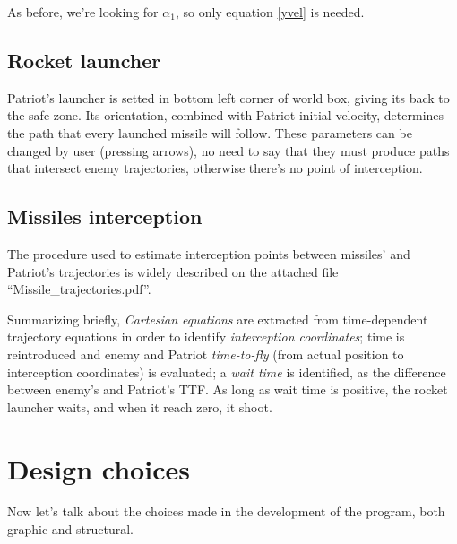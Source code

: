\documentclass[notitlepage,a4paper,11pt]{article} %
\begin{document}
			As before, we're looking for $\alpha_1$, so only equation \eqref{yvel} is needed.

	\subsection{Rocket launcher}
		Patriot's launcher is setted in bottom left corner of world box, giving its back to the safe zone.
		Its orientation, combined with Patriot initial velocity, determines the path that every launched missile 
		 will follow.
		These parameters can be changed by user (pressing arrows), no need to say that they must produce paths that intersect enemy trajectories, otherwise there's no point of interception.

	\subsection{Missiles interception}

		The procedure used to estimate interception points between missiles' and Patriot's trajectories is widely described on the attached file \mbox{``Missile\_trajectories.pdf''}.

		Summarizing briefly, \emph{Cartesian equations} are extracted from time-dependent trajectory equations in order to identify \emph{interception coordinates}; time is reintroduced and enemy and Patriot \emph{time-to-fly} (from actual position to interception coordinates) is evaluated; a \emph{wait time} is identified, as the difference between enemy's and Patriot's TTF. As long as wait time is positive, the rocket launcher waits, and when it reach zero, it shoot.

\section{Design choices}

	Now let's talk about the choices made in the development of the program, both graphic and structural.
\end{document}
